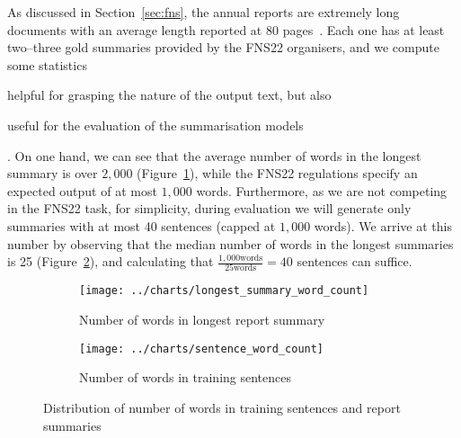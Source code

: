 As discussed in Section~\ref{sec:fns}, the annual reports are extremely long documents with an average length reported at 80 pages~\cite{litvak-vanetik-2021-summarization}.
Each one has at least two--three gold summaries provided by the FNS22 organisers, and we compute some statistics
\begin{enumerate*}[label=(\alph*)]
    \item helpful for grasping the nature of the output text, but also
    \item useful for the evaluation of the summarisation models
\end{enumerate*}.
On one hand, we can see that the average number of words in the longest summary is over $2,000$ (Figure~\ref{fig:longest_summary_word_count}), while the FNS22 regulations specify an expected output of at most $1,000$ words.
Furthermore, as we are not competing in the FNS22 task, for simplicity, during evaluation we will generate only summaries with at most 40 sentences (capped at $1,000$ words).
We arrive at this number by observing that the median number of words in the longest summaries is 25 (Figure~\ref{fig:sentence_word_count}), and calculating that $\frac{1,000\text{words}}{25\text{words}}=40$ sentences can suffice.

\begin{figure}[ht]
    \begin{subfigure}{0.49\textwidth}
        \centering        \texttt{[image: ../charts/longest\_summary\_word\_count]}
        \caption{Number of words in longest report summary}
        \label{fig:longest_summary_word_count}
    \end{subfigure}%
    \hfill
    \begin{subfigure}{0.49\textwidth}
        \centering
        \texttt{[image: ../charts/sentence\_word\_count]}
        \caption{Number of words in training sentences}
        \label{fig:sentence_word_count}
    \end{subfigure}
    \caption{Distribution of number of words in training sentences and report summaries}
    \label{fig:word_count}
\end{figure}

